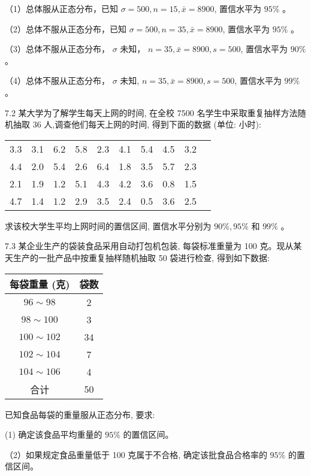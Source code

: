 \documentclass[10pt]{article}
\begin{document}
\begin{CJK*}{UTF8}{bsmi}
（1）总体服从正态分布，已知 $\sigma=500, n=15, \bar{x}=8900$, 置信水平为 $95 \%$ 。

（2）总体不服从正态分布，已知 $\sigma=500, n=35, \bar{x}=8900$, 置信水平为 $95 \%$ 。

（3）总体不服从正态分布， $\sigma$ 未知， $n=35, \bar{x}=8900, s=500$, 置信水平为 $90 \%$ 。

（4）总体不服从正态分布， $\sigma$ 未知, $n=35, \bar{x}=8900, s=500$, 置信水平为 $99 \%$ 。

7.2 某大学为了解学生每天上网的时间, 在全校 7500 名学生中采取重复抽样方法随机抽取 36 人,调查他们每天上网的时间, 得到下面的数据 (单位: 小时):

\begin{center}
\begin{tabular}{llllllllll}
\hline
3.3 & 3.1 & 6.2 & 5.8 & 2.3 & 4.1 & 5.4 & 4.5 & 3.2 \\
4.4 & 2.0 & 5.4 & 2.6 & 6.4 & 1.8 & 3.5 & 5.7 & 2.3 \\
2.1 & 1.9 & 1.2 & 5.1 & 4.3 & 4.2 & 3.6 & 0.8 & 1.5 \\
4.7 & 1.4 & 1.2 & 2.9 & 3.5 & 2.4 & 0.5 & 3.6 & 2.5 \\
\hline
\end{tabular}
\end{center}

求该校大学生平均上网时间的置信区间, 置信水平分别为 $90 \%, 95 \%$ 和 $99 \%$ 。

7.3 某企业生产的袋装食品采用自动打包机包装, 每袋标准重量为 100 克。现从某天生产的一批产品中按重复抽样随机抽取 50 袋进行检查, 得到如下数据:

\begin{center}
\begin{tabular}{cc}
\hline
每袋重量 (克) & 袋数 \\
\hline
$96 \sim 98$ & 2 \\
$98 \sim 100$ & 3 \\
$100 \sim 102$ & 34 \\
$102 \sim 104$ & 7 \\
$104 \sim 106$ & 4 \\
\hline
合计 & 50 \\
\hline
\end{tabular}
\end{center}

已知食品每袋的重量服从正态分布, 要求:

(1) 确定该食品平均重量的 $95 \%$ 的置信区间。

（2）如果规定食品重量低于 100 克属于不合格, 确定该批食品合格率的 $95 \%$ 的置信区间。


\end{CJK*}
\end{document}

